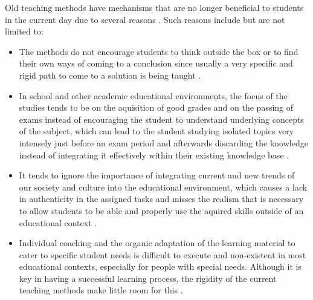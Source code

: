 Old teaching methods have mechanisms that are no longer beneficial to students in the current day due to several reasons \cite{compare}.
Such reasons include but are not limited to:
\begin{itemize}
\item The methods do not encourage students to think outside the box or to find their own ways of coming to a conclusion since usually a very specific and rigid path to come to a solution is being taught \cite{compare}.
\item In school and other academic educational environments, the focus of the studies tends to be on the aquisition of good grades and on the passing of exams instead of encouraging the student to understand underlying concepts of the subject, which can lead to the student studying isolated topics very intensely just before an exam period and afterwards discarding the knowledge instead of integrating it effectively within their existing knowledge base \cite{compare}.
\item It tends to ignore the importance of integrating current and new trends of our society and culture into the educational environment, which causes a lack in authenticity in the assigned tasks and misses the realism that is necessary to allow students to be able and properly use the aquired skills outside of an educational context \cite{compare}.
\item Individual coaching and the organic adaptation of the learning material to cater to specific student needs is difficult to execute and non-existent in most educational contexts, especially for people with special needs. Although it is key in having a successful learning process, the rigidity of the current teaching methods make little room for this \cite{traditional}.
\end{itemize}

